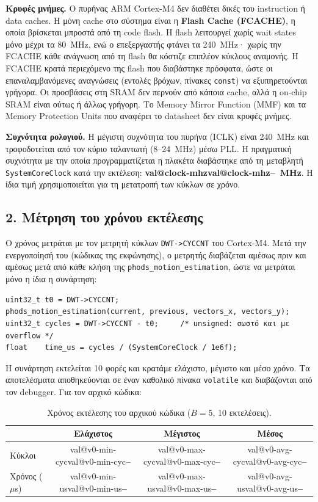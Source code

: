 \documentclass[11pt,a4paper]{article}
\makeatletter
\newcommand{\pend}{\textcolor{pendframe}{\textbf{--}}}
\newcommand{\val}[1]{\ifcsname val@#1\endcsname\csname val@#1\endcsname\else\pend\fi}
\makeatother
\begin{document}
\textbf{Κρυφές μνήμες.} Ο πυρήνας ARM Cortex-M4 δεν διαθέτει δικές του instruction ή data
caches. Η μόνη cache στο σύστημα είναι η \textbf{Flash Cache (FCACHE)}, η οποία βρίσκεται
μπροστά από τη code flash. Η flash λειτουργεί χωρίς wait states μόνο μέχρι τα 80~MHz,
ενώ ο επεξεργαστής φτάνει τα 240~MHz· χωρίς την FCACHE κάθε ανάγνωση από τη flash θα
κόστιζε επιπλέον κύκλους αναμονής. Η FCACHE κρατά περιεχόμενο της flash που διαβάστηκε
πρόσφατα, ώστε οι επαναλαμβανόμενες αναγνώσεις (εντολές βρόχων, πίνακες \texttt{const})
να εξυπηρετούνται γρήγορα. Οι προσβάσεις στη SRAM δεν περνούν από κάποια cache, αλλά η
on-chip SRAM είναι ούτως ή άλλως γρήγορη. Το Memory Mirror Function (MMF) και τα Memory
Protection Units που αναφέρει το datasheet δεν είναι κρυφές μνήμες.

\textbf{Συχνότητα ρολογιού.} Η μέγιστη συχνότητα του πυρήνα (ICLK) είναι 240~MHz και
τροφοδοτείται από τον κύριο ταλαντωτή (8--24~MHz) μέσω PLL. Η πραγματική συχνότητα με την
οποία προγραμματίζεται η πλακέτα διαβάστηκε από τη μεταβλητή \texttt{SystemCoreClock}
κατά την εκτέλεση: \textbf{\val{clock-mhz}~MHz}. Η ίδια τιμή χρησιμοποιείται για τη
μετατροπή των κύκλων σε χρόνο.

\subsection*{2. Μέτρηση του χρόνου εκτέλεσης}

Ο χρόνος μετράται με τον μετρητή κύκλων \texttt{DWT->CYCCNT} του Cortex-M4. Μετά την
ενεργοποίησή του (κώδικας της εκφώνησης), ο μετρητής διαβάζεται αμέσως πριν και αμέσως μετά
από κάθε κλήση της \texttt{phods\_motion\_estimation}, ώστε να μετράται μόνο η ίδια η
συνάρτηση:

\begin{lstlisting}
uint32_t t0 = DWT->CYCCNT;
phods_motion_estimation(current, previous, vectors_x, vectors_y);
uint32_t cycles = DWT->CYCCNT - t0;     /* unsigned: σωστό και με overflow */
float    time_us = cycles / (SystemCoreClock / 1e6f);
\end{lstlisting}

Η συνάρτηση εκτελείται 10 φορές και κρατάμε ελάχιστο, μέγιστο και μέσο χρόνο. Τα αποτελέσματα
αποθηκεύονται σε έναν καθολικό πίνακα \texttt{volatile} και διαβάζονται από τον debugger.
Για τον αρχικό κώδικα:

\begin{table}[H]
\centering
\caption{Χρόνος εκτέλεσης του αρχικού κώδικα ($B = 5$, 10 εκτελέσεις).}
\label{tab:q2}
\begin{tabular}{@{}lccc@{}}
\toprule
 & Ελάχιστος & Μέγιστος & Μέσος \\
\midrule
Κύκλοι          & \val{v0-min-cyc} & \val{v0-max-cyc} & \val{v0-avg-cyc} \\
Χρόνος ($\mu$s) & \val{v0-min-us}  & \val{v0-max-us}  & \val{v0-avg-us} \\
\bottomrule
\end{tabular}
\end{table}
\end{document}

